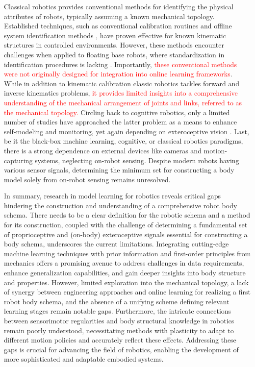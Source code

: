 \documentclass[12pt, a4paper]{article}
\newcommand{\redtext}[1]{\textcolor{red}{#1}}
\begin{document}
Classical robotics provides conventional methods for identifying the physical attributes of robots, typically assuming a known mechanical topology. Established techniques, such as conventional calibration routines \cite{Hollerbach1996CalibrationIndexTaxonomy} and offline system identification methods \cite{Swevers2007Dynamicmodelidentification,LeboutetInertialParameterIdentification}, have proven effective for known kinematic structures in controlled environments. However, these methods encounter challenges when applied to floating base robots, where standardization in identification procedures is lacking \cite{Ayusawa2014Identifiabilityidentificationinertial,Lee2022OptimizedSystemIdentification}. Importantly, \redtext{these conventional methods were not originally designed for integration into online learning frameworks}. While in addition to kinematic calibration classic robotics tackles forward and inverse kinematics problems, \redtext{it provides limited insights into a comprehensive understanding of the mechanical arrangement of joints and links, referred to as the mechanical topology.} Circling back to cognitive robotics, only a limited number of studies have approached the latter problem as a means to enhance self-modeling and monitoring, yet again depending on exteroceptive vision \cite{Bongard2006Automatedsynthesisbody,Bongard2006Resilientmachinescontinuous}. Last, be it the black-box machine learning, cognitive, or classical robotics paradigms, there is a strong dependence on external devices like cameras and motion-capturing systems, neglecting on-robot sensing. Despite modern robots having various sensor signals, determining the minimum set for constructing a body model solely from on-robot sensing remains unresolved.

In summary, research in model learning for robotics reveals critical gaps hindering the construction and understanding of a comprehensive robot body schema. There needs to be a clear definition for the robotic schema and a method for its construction, coupled with the challenge of determining a fundamental set of proprioceptive and (on-body) exteroceptive signals essential for constructing a body schema, underscores the current limitations. Integrating cutting-edge machine learning techniques with prior information and first-order principles from mechanics offers a promising avenue to address challenges in data requirements, enhance generalization capabilities, and gain deeper insights into body structure and properties. However, limited exploration into the mechanical topology, a lack of synergy between engineering approaches and online learning for realizing a first robot body schema, and the absence of a unifying scheme defining relevant learning stages remain notable gaps. Furthermore, the intricate connections between sensorimotor regularities and body structural knowledge in robotics remain poorly understood, necessitating methods with plasticity to adapt to different motion policies and accurately reflect these effects. Addressing these gaps is crucial for advancing the field of robotics, enabling the development of more sophisticated and adaptable embodied systems.
\end{document}
